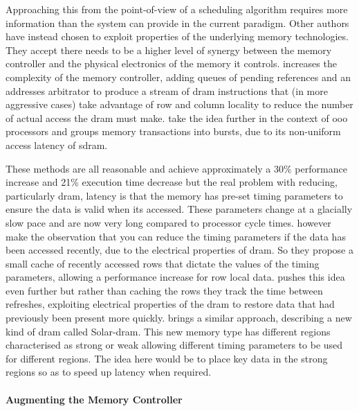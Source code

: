 Approaching this from the point-of-view of a scheduling algorithm requires more information than the system can provide in the current paradigm. Other authors have instead chosen to exploit properties of the underlying memory technologies. They accept there needs to be a higher level of synergy between the memory controller and the physical electronics of the memory it controls. \citet{rixnerMemoryAccessScheduling2000} increases the complexity of the memory controller, adding queues of pending references and an addresses arbitrator to produce a stream of \gls{dram} instructions that (in more aggressive cases) take advantage of row and column locality to reduce the number of actual access the \gls{dram} must make. \citet{shaoBurstSchedulingAccess2007} take the idea further in the context of \gls{ooo} processors and groups memory transactions into bursts, due to its non-uniform access latency of \gls{sdram}. 

These methods are all reasonable and achieve approximately a 30\% performance increase \cite{rixnerMemoryAccessScheduling2000} and 21\% execution time decrease \cite{shaoBurstSchedulingAccess2007} but the real problem with reducing, particularly \gls{dram}, latency is that the memory has pre-set timing parameters to ensure the data is valid when its accessed. These parameters change at a glacially slow pace and are now very long compared to processor cycle times. \citet{hassanChargeCacheReducingDRAM2016} however make the observation that you can reduce the timing parameters if the data has been accessed recently, due to the electrical properties of \gls{dram}. So they propose a small cache of recently accessed rows that dictate the values of the timing parameters, allowing a performance increase for row local data. \citet{shinDRAMLatencyOptimizationInspired2016} pushes this idea even further but rather than caching the rows they track the time between refreshes, exploiting electrical properties of the \gls{dram} to restore data that had previously been present more quickly. \citet{kimSolarDRAMReducingDRAM2018} brings a similar approach, describing a new kind of \gls{dram} called Solar-\gls{dram}. This new memory type has different regions characterised as strong or weak allowing different timing parameters to be used for different regions. The idea here would be to place key data in the strong regions so as to speed up latency when required. 

\paragraph{Augmenting the Memory Controller}

